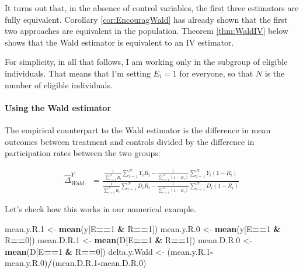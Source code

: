 \documentclass[]{book}
\newenvironment{Shaded}{\begin{snugshade}}{\end{snugshade}}
\newcommand{\KeywordTok}[1]{\textcolor[rgb]{0.13,0.29,0.53}{\textbf{#1}}}
\newcommand{\DecValTok}[1]{\textcolor[rgb]{0.00,0.00,0.81}{#1}}
\newcommand{\StringTok}[1]{\textcolor[rgb]{0.31,0.60,0.02}{#1}}
\newcommand{\OperatorTok}[1]{\textcolor[rgb]{0.81,0.36,0.00}{\textbf{#1}}}
\newcommand{\NormalTok}[1]{#1}
\let\oldparagraph\paragraph
\renewcommand{\paragraph}[1]{\oldparagraph{#1}\mbox{}}
\theoremstyle{definition}
\theoremstyle{definition}
\theoremstyle{definition}
\theoremstyle{remark}
\let\BeginKnitrBlock\begin \let\EndKnitrBlock\end
\begin{document}
It turns out that, in the absence of control variables, the first three
estimators are fully equivalent. Corollary \ref{cor:EncouragWald} has
already shown that the first two approaches are equivalent in the
population. Theorem \ref{thm:WaldIV} below shows that the Wald estimator
is equivalent to an IV estimator.

For simplicity, in all that follows, I am working only in the subgroup
of eligible individuals. That means that I'm setting \(E_i=1\) for
everyone, so that \(N\) is the number of eligible individuals.

\paragraph{Using the Wald estimator}\label{using-the-wald-estimator}

The empirical counterpart to the Wald estimator is the difference in
mean outcomes between treatment and controls divided by the difference
in participation rates between the two groups:

\begin{align*}
\hat{\Delta}^Y_{Wald} & = \frac{\frac{1}{\sum_{i=1}^N R_i}\sum_{i=1}^N Y_iR_i-\frac{1}{\sum_{i=1}^N (1-R_i)}\sum_{i=1}^N Y_i(1-R_i)}{\frac{1}{\sum_{i=1}^N R_i}\sum_{i=1}^N D_iR_i-\frac{1}{\sum_{i=1}^N (1-R_i)}\sum_{i=1}^N D_i(1-R_i)}
\end{align*}

\BeginKnitrBlock{example}
\protect\hypertarget{exm:unnamed-chunk-121}{}{\label{exm:unnamed-chunk-121}
}Let's check how this works in our numerical example.
\EndKnitrBlock{example}

\begin{Shaded}
\begin{Highlighting}[]
\NormalTok{mean.y.R.}\DecValTok{1}\NormalTok{ <-}\StringTok{ }\KeywordTok{mean}\NormalTok{(y[E}\OperatorTok{==}\DecValTok{1} \OperatorTok{&}\StringTok{ }\NormalTok{R}\OperatorTok{==}\DecValTok{1}\NormalTok{])}
\NormalTok{mean.y.R.}\DecValTok{0}\NormalTok{ <-}\StringTok{ }\KeywordTok{mean}\NormalTok{(y[E}\OperatorTok{==}\DecValTok{1} \OperatorTok{&}\StringTok{ }\NormalTok{R}\OperatorTok{==}\DecValTok{0}\NormalTok{])}
\NormalTok{mean.D.R.}\DecValTok{1}\NormalTok{ <-}\StringTok{ }\KeywordTok{mean}\NormalTok{(D[E}\OperatorTok{==}\DecValTok{1} \OperatorTok{&}\StringTok{ }\NormalTok{R}\OperatorTok{==}\DecValTok{1}\NormalTok{])}
\NormalTok{mean.D.R.}\DecValTok{0}\NormalTok{ <-}\StringTok{ }\KeywordTok{mean}\NormalTok{(D[E}\OperatorTok{==}\DecValTok{1} \OperatorTok{&}\StringTok{ }\NormalTok{R}\OperatorTok{==}\DecValTok{0}\NormalTok{])}
\NormalTok{delta.y.Wald <-}\StringTok{ }\NormalTok{(mean.y.R.}\DecValTok{1}\OperatorTok{-}\NormalTok{mean.y.R.}\DecValTok{0}\NormalTok{)}\OperatorTok{/}\NormalTok{(mean.D.R.}\DecValTok{1}\OperatorTok{-}\NormalTok{mean.D.R.}\DecValTok{0}\NormalTok{)}
\end{Highlighting}
\end{Shaded}
\end{document}
